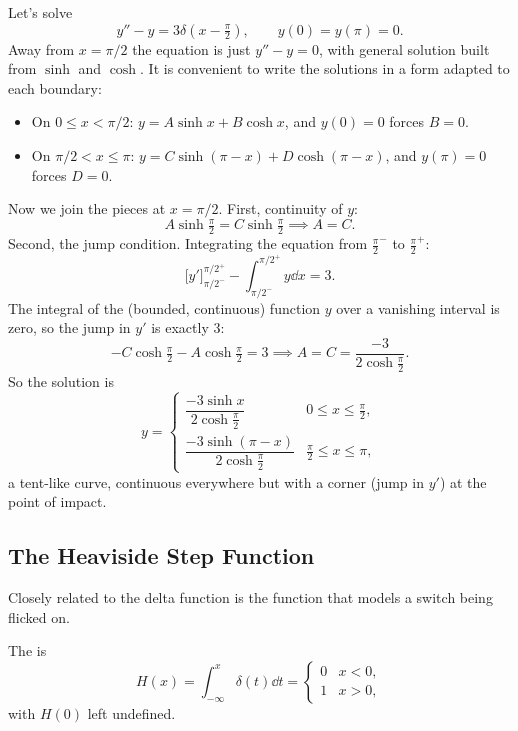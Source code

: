 \documentclass[a4paper]{scrartcl}
\begin{document}
\begin{example}
	Let's solve
	$$
	y'' - y = 3 \delta\left(x - \tfrac \pi 2\right), \qquad y(0) = y(\pi) = 0.
	$$
	Away from $x = \pi/2$ the equation is just $y'' - y = 0$, with general solution built from $\sinh$ and $\cosh$. It is convenient to write the solutions in a form adapted to each boundary:
	\begin{itemize}
		\item On $0 \leq x < \pi/2$: $y = A \sinh x + B \cosh x$, and $y(0) = 0$ forces $B = 0$.
		\item On $\pi/2 < x \leq \pi$: $y = C \sinh(\pi - x) + D\cosh(\pi - x)$, and $y(\pi) = 0$ forces $D = 0$.
	\end{itemize}
	Now we join the pieces at $x = \pi/2$. First, continuity of $y$:
	$$
	A \sinh \tfrac\pi2 = C \sinh \tfrac \pi 2 \implies A = C.
	$$
	Second, the jump condition. Integrating the equation from $\frac\pi2^-$ to $\frac\pi2^+$:
	$$
	\big[y'\big]_{\pi/2^-}^{\pi/2^+} - \int_{\pi/2^-}^{\pi/2^+} y \dd x = 3.
	$$
	The integral of the (bounded, continuous) function $y$ over a vanishing interval is zero, so the jump in $y'$ is exactly $3$:
	$$
	-C \cosh \tfrac\pi2 - A \cosh \tfrac\pi2 = 3 \implies A = C = \frac{-3}{2\cosh \frac\pi2}.
	$$
	So the solution is
	$$
	y = \begin{cases} \dfrac{-3 \sinh x}{2 \cosh \frac\pi2} & 0 \leq x \leq \frac\pi2, \\[8pt] \dfrac{-3\sinh(\pi - x)}{2\cosh\frac\pi2} & \frac\pi2 \leq x \leq \pi, \end{cases}
	$$
	a tent-like curve, continuous everywhere but with a corner (jump in $y'$) at the point of impact.
\end{example}

\subsection{The Heaviside Step Function}

Closely related to the delta function is the function that models a switch being flicked on.

\begin{definition}
	The  is
	$$
	H(x) = \int_{-\infty}^{x} \delta(t) \dd t = \begin{cases} 0 & x < 0, \\ 1 & x > 0, \end{cases}
	$$
	with $H(0)$ left undefined.
\end{definition}
\end{document}
